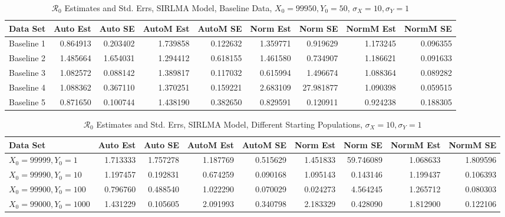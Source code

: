 \documentclass[12pt]{article}
\newcommand{\rr}{\ensuremath{\mathcal{R}_0}}
\begin{document}
\begin{table}[H]
	
	\caption{$\rr$ Estimates and Std. Errs, SIRLMA Model,
		Baseline Data, $X_0 = 99950, Y_0 = 50$, 
		$\sigma_X = 10, \sigma_Y = 1$}
	\begin{footnotesize}
		\hskip -1cm
		\begin{tabular}{l|r|r|r|r|r|r|r|r}
			\hline
			Data Set & Auto Est & Auto SE & AutoM Est & AutoM SE & Norm Est & Norm SE & NormM Est & NormM SE\\
			\hline
			Baseline 1 & 0.864913 & 0.203402 & 1.739858 & 0.122632 & 1.359771 & 0.919629 & 1.173245 & 0.096355\\
			\hline
			Baseline 2 & 1.485664 & 1.654031 & 1.294412 & 0.618155 & 1.461580 & 0.734907 & 1.186621 & 0.091633\\
			\hline
			Baseline 3 & 1.082572 & 0.088142 & 1.389817 & 0.117032 & 0.615994 & 1.496674 & 1.088364 & 0.089282\\
			\hline
			Baseline 4 & 1.088362 & 0.367110 & 1.370251 & 0.159221 & 2.683109 & 27.981877 & 1.090398 & 0.059515\\
			\hline
			Baseline 5 & 0.871650 & 0.100744 & 1.438190 & 0.382650 & 0.829591 & 0.120911 & 0.924238 & 0.188305\\
			\hline
		\end{tabular}
	\end{footnotesize}
\end{table}

\begin{table}[H]
	
	\caption{$\rr$ Estimates and Std. Errs, SIRLMA Model,
		Different Starting Populations, 
		$\sigma_X = 10, \sigma_Y = 1$}
	\begin{footnotesize}
		\hskip -1.7cm
		\begin{tabular}{l|r|r|r|r|r|r|r|r}
			\hline
			Data Set & Auto Est & Auto SE & AutoM Est & AutoM SE & Norm Est & Norm SE & NormM Est & NormM SE\\
			\hline
			$X_0 = 99999, Y_0 = 1$ & 1.713333 & 1.757278 & 1.187769 & 0.515629 & 1.451833 & 59.746089 & 1.068633 & 1.809596\\
			\hline
			$X_0 = 99990, Y_0 = 10$ & 1.197457 & 0.192831 & 0.674259 & 0.090168 & 1.095143 & 0.143146 & 1.199437 & 0.106393\\
			\hline
			$X_0 = 99900, Y_0 = 100$ & 0.796760 & 0.488540 & 1.022290 & 0.070029 & 0.024273 & 4.564245 & 1.265712 & 0.080303\\
			\hline
			$X_0 = 99000, Y_0 = 1000$ & 1.431229 & 0.105605 & 2.091993 & 0.340798 & 2.183329 & 0.428090 & 1.812900 & 0.122106\\
			\hline
		\end{tabular}
	\end{footnotesize}
\end{table}
\end{document}
